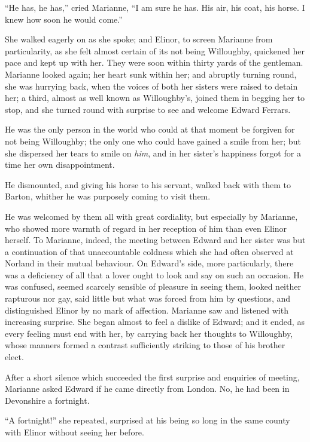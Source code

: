 ``He has, he has,'' cried Marianne, ``I am sure he has.
His air, his coat, his horse.  I knew how soon he would come.''

She walked eagerly on as she spoke; and Elinor,
to screen Marianne from particularity, as she felt almost
certain of its not being Willoughby, quickened her
pace and kept up with her.  They were soon within
thirty yards of the gentleman.  Marianne looked again;
her heart sunk within her; and abruptly turning round,
she was hurrying back, when the voices of both her sisters
were raised to detain her; a third, almost as well known
as Willoughby's, joined them in begging her to stop,
and she turned round with surprise to see and welcome
Edward Ferrars.

He was the only person in the world who could
at that moment be forgiven for not being Willoughby;
the only one who could have gained a smile from her;
but she dispersed her tears to smile on \emph{him}, and in her
sister's happiness forgot for a time her own disappointment.

He dismounted, and giving his horse to his servant,
walked back with them to Barton, whither he was purposely
coming to visit them.

He was welcomed by them all with great cordiality,
but especially by Marianne, who showed more warmth of
regard in her reception of him than even Elinor herself.
To Marianne, indeed, the meeting between Edward and her sister
was but a continuation of that unaccountable coldness which she
had often observed at Norland in their mutual behaviour.
On Edward's side, more particularly, there was a deficiency
of all that a lover ought to look and say on such an occasion.
He was confused, seemed scarcely sensible of pleasure
in seeing them, looked neither rapturous nor gay,
said little but what was forced from him by questions,
and distinguished Elinor by no mark of affection.
Marianne saw and listened with increasing surprise.
She began almost to feel a dislike of Edward; and it ended,
as every feeling must end with her, by carrying back her
thoughts to Willoughby, whose manners formed a contrast
sufficiently striking to those of his brother elect.

After a short silence which succeeded the first
surprise and enquiries of meeting, Marianne asked
Edward if he came directly from London.  No, he had
been in Devonshire a fortnight.

``A fortnight!'' she repeated, surprised at his being
so long in the same county with Elinor without seeing
her before.

